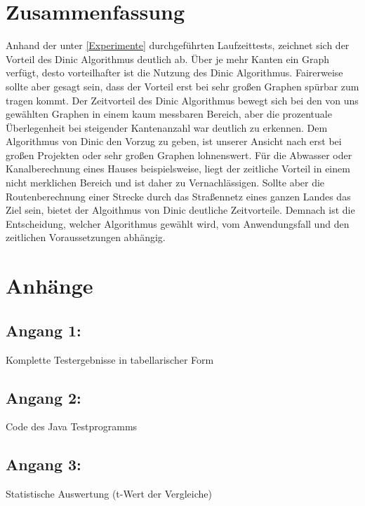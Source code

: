 \documentclass[a4paper]{llncs}
\begin{document}
\section{Zusammenfassung}
\label{Zusammenfassung}
Anhand der unter \ref{Experimente} durchgeführten Laufzeittests, zeichnet sich der Vorteil des Dinic Algorithmus deutlich ab. Über je mehr Kanten ein Graph verfügt, desto vorteilhafter ist die Nutzung des Dinic Algorithmus. Fairerweise sollte aber gesagt sein, dass der Vorteil erst bei sehr großen Graphen spürbar zum tragen kommt. Der Zeitvorteil des Dinic Algorithmus bewegt sich bei den von uns gewählten Graphen in einem kaum messbaren Bereich, aber die prozentuale Überlegenheit bei steigender Kantenanzahl war deutlich zu erkennen. Dem Algorithmus von Dinic den Vorzug zu geben, ist unserer Ansicht nach erst bei großen Projekten oder sehr großen Graphen lohnenswert. Für die Abwasser oder Kanalberechnung eines Hauses beispielsweise, liegt der zeitliche Vorteil in einem nicht merklichen Bereich und ist daher zu Vernachlässigen. Sollte aber die Routenberechnung einer Strecke durch das Straßennetz eines ganzen Landes das Ziel sein, bietet der Algoithmus von Dinic deutliche Zeitvorteile. Demnach ist die Entscheidung, welcher Algorithmus gewählt wird, vom Anwendungsfall und den zeitlichen Voraussetzungen abhängig.


 

\section{Anhänge}
\subsection{Angang 1:}
Komplette Testergebnisse in tabellarischer Form

%

\subsection{Angang 2:}
Code des Java Testprogramms

\subsection{Angang 3:}
Statistische Auswertung (t-Wert der Vergleiche)
\end{document}

